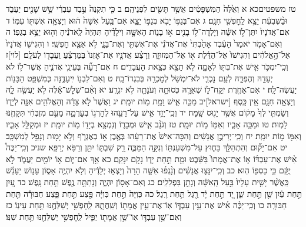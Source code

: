 \documentclass[twoside, openany, parskip=half, 11pt]{book}
\begin{document}
טז משפטיםכא א וְאֵ֙לֶּה֙ הַמִּשְׁפָּטִ֔ים אֲשֶׁ֥ר תָּשִׂ֖ים לִפְנֵיהֶֽם׃ ב כִּ֤י תִקְנֶה֙ עֶ֣בֶד עִבְרִ֔י שֵׁ֥שׁ שָׁנִ֖ים יַעֲבֹ֑ד וּבַ֨שְּׁבִעִ֔ת יֵצֵ֥א לַֽחׇפְשִׁ֖י חִנָּֽם׃ ג אִם־בְּגַפּ֥וֹ יָבֹ֖א בְּגַפּ֣וֹ יֵצֵ֑א אִם־בַּ֤עַל אִשָּׁה֙ ה֔וּא וְיָצְאָ֥ה אִשְׁתּ֖וֹ עִמּֽוֹ׃ ד אִם־אֲדֹנָיו֙ יִתֶּן־ל֣וֹ אִשָּׁ֔ה וְיָלְדָה־ל֥וֹ בָנִ֖ים א֣וֹ בָנ֑וֹת הָאִשָּׁ֣ה וִילָדֶ֗יהָ תִּהְיֶה֙ לַֽאדֹנֶ֔יהָ וְה֖וּא יֵצֵ֥א בְגַפּֽוֹ׃ ה וְאִם־אָמֹ֤ר יֹאמַר֙ הָעֶ֔בֶד אָהַ֙בְתִּי֙ אֶת־אֲדֹנִ֔י אֶת־אִשְׁתִּ֖י וְאֶת־בָּנָ֑י לֹ֥א אֵצֵ֖א חׇפְשִֽׁי׃ ו וְהִגִּישׁ֤וֹ אֲדֹנָיו֙ אֶל־הָ֣אֱלֹהִ֔ים וְהִגִּישׁוֹ֙ אֶל־הַדֶּ֔לֶת א֖וֹ אֶל־הַמְּזוּזָ֑ה וְרָצַ֨ע אֲדֹנָ֤יו אֶת־אׇזְנוֹ֙ בַּמַּרְצֵ֔עַ וַעֲבָד֖וֹ לְעֹלָֽם׃
[לוי]ז וְכִֽי־יִמְכֹּ֥ר אִ֛ישׁ אֶת־בִּתּ֖וֹ לְאָמָ֑ה לֹ֥א תֵצֵ֖א כְּצֵ֥את הָעֲבָדִֽים׃ ח אִם־רָעָ֞ה בְּעֵינֵ֧י אֲדֹנֶ֛יהָ אֲשֶׁר־ל֥וֹ לא יְעָדָ֖הּ וְהֶפְדָּ֑הּ לְעַ֥ם נׇכְרִ֛י לֹא־יִמְשֹׁ֥ל לְמׇכְרָ֖הּ בְּבִגְדוֹ־בָֽהּ׃ ט וְאִם־לִבְנ֖וֹ יִֽיעָדֶ֑נָּה כְּמִשְׁפַּ֥ט הַבָּנ֖וֹת יַעֲשֶׂה־לָּֽהּ׃ י אִם־אַחֶ֖רֶת יִֽקַּֽח־ל֑וֹ שְׁאֵרָ֛הּ כְּסוּתָ֥הּ וְעֹנָתָ֖הּ לֹ֥א יִגְרָֽע׃ יא וְאִ֨ם־שְׁלׇשׁ־אֵ֔לֶּה לֹ֥א יַעֲשֶׂ֖ה לָ֑הּ וְיָצְאָ֥ה חִנָּ֖ם אֵ֥ין כָּֽסֶף׃
[ישראל]יב מַכֵּ֥ה אִ֛ישׁ וָמֵ֖ת מ֥וֹת יוּמָֽת׃ יג וַאֲשֶׁר֙ לֹ֣א צָדָ֔ה וְהָאֱלֹהִ֖ים אִנָּ֣ה לְיָד֑וֹ וְשַׂמְתִּ֤י לְךָ֙ מָק֔וֹם אֲשֶׁ֥ר יָנ֖וּס שָֽׁמָּה׃
יד וְכִֽי־יָזִ֥ד אִ֛ישׁ עַל־רֵעֵ֖הוּ לְהׇרְג֣וֹ בְעׇרְמָ֑ה מֵעִ֣ם מִזְבְּחִ֔י תִּקָּחֶ֖נּוּ לָמֽוּת׃
טו וּמַכֵּ֥ה אָבִ֛יו וְאִמּ֖וֹ מ֥וֹת יוּמָֽת׃
טז וְגֹנֵ֨ב אִ֧ישׁ וּמְכָר֛וֹ וְנִמְצָ֥א בְיָד֖וֹ מ֥וֹת יוּמָֽת׃
יז וּמְקַלֵּ֥ל אָבִ֛יו וְאִמּ֖וֹ מ֥וֹת יוּמָֽת׃
יח וְכִֽי־יְרִיבֻ֣ן אֲנָשִׁ֔ים וְהִכָּה־אִישׁ֙ אֶת־רֵעֵ֔הוּ בְּאֶ֖בֶן א֣וֹ בְאֶגְרֹ֑ף וְלֹ֥א יָמ֖וּת וְנָפַ֥ל לְמִשְׁכָּֽב׃ יט אִם־יָק֞וּם וְהִתְהַלֵּ֥ךְ בַּח֛וּץ עַל־מִשְׁעַנְתּ֖וֹ וְנִקָּ֣ה הַמַּכֶּ֑ה רַ֥ק שִׁבְתּ֛וֹ יִתֵּ֖ן וְרַפֹּ֥א יְרַפֵּֽא׃
שניכ וְכִֽי־יַכֶּה֩ אִ֨ישׁ אֶת־עַבְדּ֜וֹ א֤וֹ אֶת־אֲמָתוֹ֙ בַּשֵּׁ֔בֶט וּמֵ֖ת תַּ֣חַת יָד֑וֹ נָקֹ֖ם יִנָּקֵֽם׃ כא אַ֥ךְ אִם־י֛וֹם א֥וֹ יוֹמַ֖יִם יַעֲמֹ֑ד לֹ֣א יֻקַּ֔ם כִּ֥י כַסְפּ֖וֹ הֽוּא׃
כב וְכִֽי־יִנָּצ֣וּ אֲנָשִׁ֗ים וְנָ֨גְפ֜וּ אִשָּׁ֤ה הָרָה֙ וְיָצְא֣וּ יְלָדֶ֔יהָ וְלֹ֥א יִהְיֶ֖ה אָס֑וֹן עָנ֣וֹשׁ יֵעָנֵ֗שׁ כַּֽאֲשֶׁ֨ר יָשִׁ֤ית עָלָיו֙ בַּ֣עַל הָֽאִשָּׁ֔ה וְנָתַ֖ן בִּפְלִלִֽים׃ כג וְאִם־אָס֖וֹן יִהְיֶ֑ה וְנָתַתָּ֥ה נֶ֖פֶשׁ תַּ֥חַת נָֽפֶשׁ׃ כד עַ֚יִן תַּ֣חַת עַ֔יִן שֵׁ֖ן תַּ֣חַת שֵׁ֑ן יָ֚ד תַּ֣חַת יָ֔ד רֶ֖גֶל תַּ֥חַת רָֽגֶל׃ כה כְּוִיָּה֙ תַּ֣חַת כְּוִיָּ֔ה פֶּ֖צַע תַּ֣חַת פָּ֑צַע חַבּוּרָ֕ה תַּ֖חַת חַבּוּרָֽה׃
כו וְכִֽי־יַכֶּ֨ה אִ֜ישׁ אֶת־עֵ֥ין עַבְדּ֛וֹ אֽוֹ־אֶת־עֵ֥ין אֲמָת֖וֹ וְשִֽׁחֲתָ֑הּ לַֽחָפְשִׁ֥י יְשַׁלְּחֶ֖נּוּ תַּ֥חַת עֵינֽוֹ׃ כז וְאִם־שֵׁ֥ן עַבְדּ֛וֹ אֽוֹ־שֵׁ֥ן אֲמָת֖וֹ יַפִּ֑יל לַֽחׇפְשִׁ֥י יְשַׁלְּחֶ֖נּוּ תַּ֥חַת שִׁנּֽוֹ׃
\end{document}
